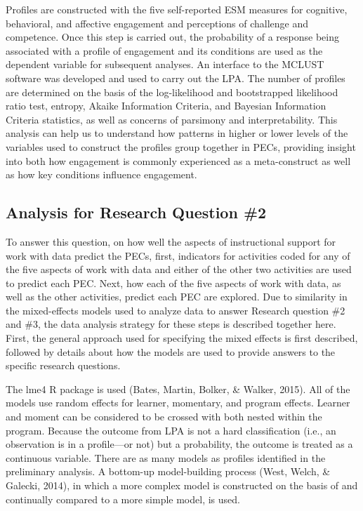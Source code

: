\documentclass[]{book}
\theoremstyle{definition}
\theoremstyle{definition}
\theoremstyle{definition}
\theoremstyle{remark}
\begin{document}
Profiles are constructed with the five self-reported ESM measures for
cognitive, behavioral, and affective engagement and perceptions of
challenge and competence. Once this step is carried out, the probability
of a response being associated with a profile of engagement and its
conditions are used as the dependent variable for subsequent analyses.
An interface to the MCLUST software was developed and used to carry out
the LPA. The number of profiles are determined on the basis of the
log-likelihood and bootstrapped likelihood ratio test, entropy, Akaike
Information Criteria, and Bayesian Information Criteria statistics, as
well as concerns of parsimony and interpretability. This analysis can
help us to understand how patterns in higher or lower levels of the
variables used to construct the profiles group together in PECs,
providing insight into both how engagement is commonly experienced as a
meta-construct as well as how key conditions influence engagement.

\subsection{Analysis for Research Question
\#2}\label{analysis-for-research-question-2}

To answer this question, on how well the aspects of instructional
support for work with data predict the PECs, first, indicators for
activities coded for any of the five aspects of work with data and
either of the other two activities are used to predict each PEC. Next,
how each of the five aspects of work with data, as well as the other
activities, predict each PEC are explored. Due to similarity in the
mixed-effects models used to analyze data to answer Research question
\#2 and \#3, the data analysis strategy for these steps is described
together here. First, the general approach used for specifying the mixed
effects is first described, followed by details about how the models are
used to provide answers to the specific research questions.

The lme4 R package is used (Bates, Martin, Bolker, \& Walker, 2015). All
of the models use random effects for learner, momentary, and program
effects. Learner and moment can be considered to be crossed with both
nested within the program. Because the outcome from LPA is not a hard
classification (i.e., an observation is in a profile---or not) but a
probability, the outcome is treated as a continuous variable. There are
as many models as profiles identified in the preliminary analysis. A
bottom-up model-building process (West, Welch, \& Galecki, 2014), in
which a more complex model is constructed on the basis of and
continually compared to a more simple model, is used.
\end{document}
